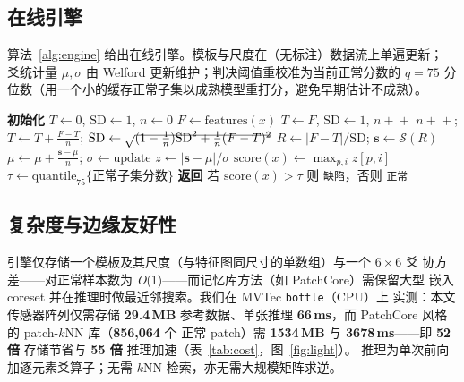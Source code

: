 \documentclass[journal,10pt]{IEEEtran}
\begin{document}
\subsection{在线引擎}
算法~\ref{alg:engine} 给出在线引擎。模板与尺度在（无标注）数据流上单遍更新；
爻统计量 $\mu,\sigma$ 由 Welford 更新维护；判决阈值重校准为当前正常分数的
$q{=}75$ 分位数（用一个小的缓存正常子集以成熟模型重打分，避免早期估计不成熟）。

\begin{algorithm}[t]
\caption{在线六爻异常引擎。\\ The online six-yao anomaly engine.}
\label{alg:engine}
\begin{algorithmic}[1]
\State \textbf{初始化} $T\!\leftarrow\!0$, $\mathrm{SD}\!\leftarrow\!1$,
       $n\!\leftarrow\!0$
    \State $F\leftarrow\mathrm{features}(x)$
     $T\leftarrow F$, $\mathrm{SD}\leftarrow 1$, $n\!+\!+$
    \Else
        \State $n\!+\!+$;
               $T\leftarrow T+\frac{F-T}{n}$;
               $\mathrm{SD}\leftarrow\sqrt{\smash{(1-\tfrac1n)\mathrm{SD}^2+\tfrac1n(F-T)^2}}$
    \EndIf
    \State $R\leftarrow|F-T|/\mathrm{SD}$;
           $\mathbf{s}\leftarrow\mathcal{S}(R)$
    \State $\mu\leftarrow\mu+\frac{\mathbf{s}-\mu}{n}$;
           $\sigma\leftarrow\mathrm{update}$ 
    \State $z\leftarrow|\mathbf{s}-\mu|/\sigma$
    \State $\mathrm{score}(x)\leftarrow\max_{p,i} z[p,i]$
    \State $\tau\leftarrow\mathrm{quantile}_{75}\{\text{正常子集分数}\}$
    \State \textbf{返回} 若 $\mathrm{score}(x)>\tau$ 则 \texttt{缺陷}，否则 \texttt{正常}
\EndFor
\end{algorithmic}
\end{algorithm}

\subsection{复杂度与边缘友好性}
引擎仅存储一个模板及其尺度（与特征图同尺寸的单数组）与一个 $6{\times}6$ 爻
协方差——对正常样本数为 \emph{O}(1)——而记忆库方法（如 PatchCore）需保留大型
嵌入 coreset 并在推理时做最近邻搜索。我们在 MVTec \texttt{bottle}（CPU）上
实测：本文传感器阵列仅需存储 \textbf{29.4\,MB} 参考数据、单张推理
\textbf{66\,ms}，而 PatchCore 风格的 patch-$k$NN 库（\textbf{856{,}064} 个
正常 patch）需 \textbf{1534\,MB} 与 \textbf{3678\,ms}——即 \textbf{52 倍}
存储节省与 \textbf{55 倍} 推理加速（表~\ref{tab:cost}，图~\ref{fig:light}）。
推理为单次前向加逐元素爻算子；无需 $k$NN 检索，亦无需大规模矩阵求逆。
\end{document}
